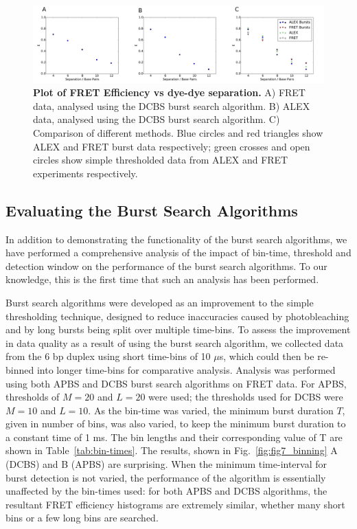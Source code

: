 \begin{figure}[!ht]
   \begin{center}
      \includegraphics*[clip=true, width=6in]{pyFRET/Bp_vs_E.pdf}
      \caption{{\bf Plot of FRET Efficiency vs dye-dye separation.} A) FRET data, analysed using the DCBS burst search algorithm. B) ALEX data, analysed using the DCBS burst search algorithm. C) Comparison of different methods. Blue circles and red triangles show ALEX and FRET burst data respectively; green crosses and open circles show simple thresholded data from ALEX and FRET experiments respectively.}
      \label{fig:fig6_Eplots}
   \end{center}
\end{figure}

\subsection{Evaluating the Burst Search Algorithms}
In addition to demonstrating the functionality of the burst search algorithms, we have performed a comprehensive analysis of the impact of bin-time, threshold and detection window on the performance of the burst search algorithms. To our knowledge, this is the first time that such an analysis has been performed.

Burst search algorithms were developed as an improvement to the simple thresholding technique, designed to reduce inaccuracies caused by photobleaching and by long bursts being split over multiple time-bins. To assess the improvement in data quality as a result of using the burst search algorithm, we collected data from the 6 bp duplex using short time-bins of 10 $\mu$s, which could then be re-binned into longer time-bins for comparative analysis. Analysis was performed using both APBS and DCBS burst search algorithms on FRET data. For APBS, thresholds of $M=20$ and $L=20$ were used; the thresholds used for DCBS were $M = 10$ and $L = 10$. As the bin-time was varied, the minimum burst duration $T$, given in number of bins, was also varied, to keep the minimum burst duration to a constant time of 1 ms. The bin lengths and their corresponding value of T are shown in Table~\ref{tab:bin-times}. The results, shown in Fig.~\ref{fig:fig7_binning} A (DCBS) and B (APBS) are surprising. When the minimum time-interval for burst detection is not varied, the performance of the algorithm is essentially unaffected by the bin-times used: for both APBS and DCBS algorithms, the resultant FRET efficiency histograms are extremely similar, whether many short bins or a few long bins are searched.


